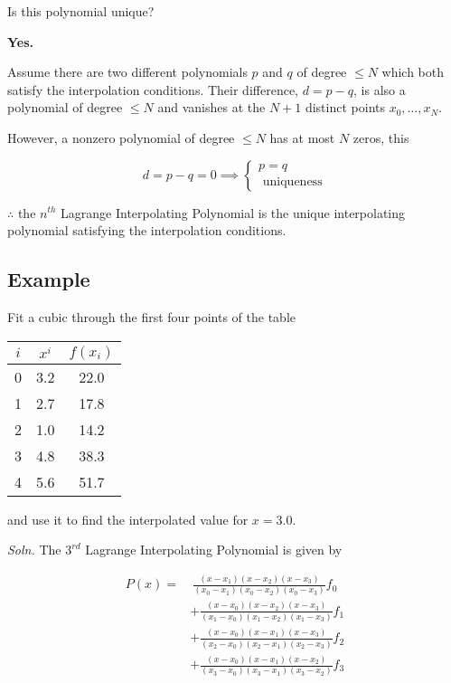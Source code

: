 \documentclass[12pt]{article}
\newcommand{\soln}{\textit{Soln.}\xspace}
\begin{document}
Is this polynomial unique?

\textbf{Yes.} 

\proof Assume there are two different polynomials $p$ and $q$ of degree $\leq N$
which both satisfy the interpolation conditions. Their difference, $d=p-q$, is
also a polynomial of degree $\leq N$ and vanishes at the $N+1$ distinct points 
$x_0,\dots,x_N$.

However, a nonzero polynomial of degree $\leq N$ has at most $N$ zeros, this

\[
d = p-q = 0 \implies \begin{cases}
  p=q\\
  \text{ uniqueness}
\end{cases}
\]

$\therefore$ the $n^{th}$ Lagrange Interpolating Polynomial is the unique
interpolating polynomial satisfying the interpolation conditions.

\subsection{Example}

Fit a cubic through the first four points of the table 

\begin{table}[h]
    \centering
    \begin{tabular}{c|c|c}
        $i$ & $x^i$ & $f(x_i)$ \\
        \hline
        0 & 3.2 & 22.0 \\
        1 & 2.7 & 17.8 \\
        2 & 1.0 & 14.2 \\
        3 & 4.8 & 38.3 \\
        4 & 5.6 & 51.7 \\
    \end{tabular}
\end{table}

and use it to find the interpolated value for $x=3.0$.

\soln The $3^{rd}$ Lagrange Interpolating Polynomial is given by

\begin{align*}
    P(x) = &\ \frac{(x - x_1)(x - x_2)(x - x_3)}{(x_0 - x_1)(x_0 - x_2)(x_0 - x_3)} f_0 \\
    &+ \frac{(x - x_0)(x - x_2)(x - x_3)}{(x_1 - x_0)(x_1 - x_2)(x_1 - x_3)} f_1 \\
    &+ \frac{(x - x_0)(x - x_1)(x - x_3)}{(x_2 - x_0)(x_2 - x_1)(x_2 - x_3)} f_2 \\
    &+ \frac{(x - x_0)(x - x_1)(x - x_2)}{(x_3 - x_0)(x_3 - x_1)(x_3 - x_2)} f_3
\end{align*}
\end{document}
